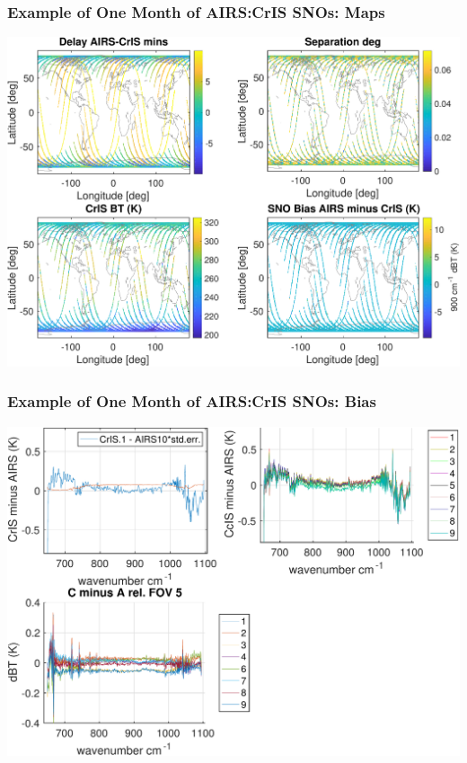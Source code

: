 \documentclass[10pt,t]{beamer}
\begin{document}
\begin{frame}
  \frametitle{Example of One Month of AIRS:CrIS SNOs: Maps}
  \begin{center}
    \includegraphics[width=0.95\linewidth]{./Figs/sno_ac1_lr_900wvn_aug2018_maps.pdf}
  \end{center}
  
\end{frame}
\begin{frame}
  \frametitle{Example of One Month of AIRS:CrIS SNOs: Bias}
  \begin{center}
    \includegraphics[width=0.95\linewidth]{./Figs/sno_ac1_lr_lw_mean_bias_jul2018.pdf}
  \end{center}
  
\end{frame}
\end{document}
